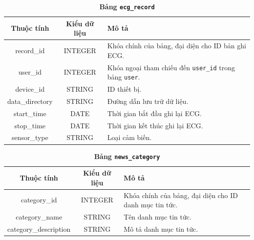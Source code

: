 \documentclass{article}%
\begin{document}
\begin{table}[H]
  \caption{\bfseries \fontsize{12pt}{0pt}\selectfont Bảng \texttt{ecg\_record}}
  \centering
  \begin{tabularx}{0.9\textwidth}{|c|c|X|}
    \hline
    \textbf{Thuộc tính} & \textbf{Kiểu dữ liệu} & \textbf{Mô tả} \\
    \hline
    record\_id & INTEGER & Khóa chính của bảng, đại diện cho ID bản ghi ECG. \\
    \hline
    user\_id & INTEGER & Khóa ngoại tham chiếu đến \texttt{user\_id} trong bảng \texttt{user}. \\
    \hline
    device\_id & STRING & ID thiết bị. \\
    \hline
    data\_directory & STRING & Đường dẫn lưu trữ dữ liệu. \\
    \hline
    start\_time & DATE & Thời gian bắt đầu ghi lại ECG. \\
    \hline
    stop\_time & DATE & Thời gian kết thúc ghi lại ECG. \\
    \hline
    sensor\_type & STRING & Loại cảm biến. \\
    \hline
  \end{tabularx}
\end{table}

\begin{table}[H]
  \caption{\bfseries \fontsize{12pt}{0pt}\selectfont Bảng \texttt{news\_category}}
  \centering
  \begin{tabularx}{0.9\textwidth}{|c|c|X|}
    \hline
    \textbf{Thuộc tính} & \textbf{Kiểu dữ liệu} & \textbf{Mô tả} \\
    \hline
    category\_id & INTEGER & Khóa chính của bảng, đại diện cho ID danh mục tin tức. \\
    \hline
    category\_name & STRING & Tên danh mục tin tức. \\
    \hline
    category\_description & STRING & Mô tả danh mục tin tức. \\
    \hline
  \end{tabularx}
\end{table}
\end{document}
